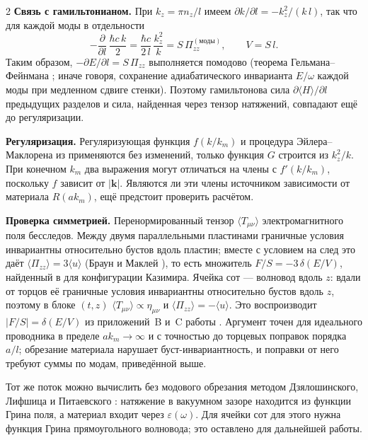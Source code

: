 \documentclass[twoside, 10pt]{article}
\def\myvspacebeforesubsection{-2.0mm}
\begin{document}
\begin{multicols}{2}
\textbf{Связь с гамильтонианом.} При $k_z=\pi n_z/l$ имеем
$\partial k/\partial l=-k_z^2/(k\,l)$, так что для каждой моды в отдельности
\[
-\frac{\partial}{\partial l}\,\frac{\hbar c\,k}{2}=\frac{\hbar c}{2\,l}\,\frac{k_z^2}{k}
= S\,\Pi_{zz}^{\mathrm{(моды)}},\qquad V=S\,l .
\]
Таким образом, $-\partial E/\partial l=S\,\Pi_{zz}$ выполняется помодово (теорема
Гельмана--Фейнмана \cite{Feynman1939}; иначе говоря, сохранение адиабатического
инварианта $E/\omega$ каждой моды при медленном сдвиге стенки). Поэтому
гамильтонова сила $\partial\langle H\rangle/\partial l$ предыдущих разделов и сила,
найденная через тензор натяжений, совпадают ещё до регуляризации.

\textbf{Регуляризация.} Регуляризующая функция $f(k/k_m)$ и процедура
Эйлера--Маклорена из \cite{Drozdov2024} применяются без изменений, только функция
$G$ строится из $k_z^2/k$. При конечном $k_m$ два выражения могут отличаться на
члены с $f'(k/k_m)$, поскольку $f$ зависит от $|\mathbf{k}|$. Являются ли эти члены
источником зависимости от материала $R(ak_m)$, ещё предстоит проверить расчётом.

\textbf{Проверка симметрией.} Перенормированный тензор $\langle T_{\mu\nu}\rangle$
электромагнитного поля бесследов. Между двумя параллельными пластинами граничные
условия инвариантны относительно бустов вдоль пластин; вместе с условием на след это
даёт $\langle\Pi_{zz}\rangle=3\langle u\rangle$ (Браун и Маклей \cite{BrownMaclay1969}),
то есть множитель $F/S=-3\,\delta(E/V)$, найденный в \cite{Drozdov2024} для
конфигурации Казимира. Ячейка сот --- волновод вдоль $z$: вдали от торцов её
граничные условия инвариантны относительно бустов вдоль $z$, поэтому в блоке $(t,z)$
$\langle T_{\mu\nu}\rangle\propto\eta_{\mu\nu}$ и $\langle\Pi_{zz}\rangle=-\langle u\rangle$.
Это воспроизводит $|F/S|=\delta(E/V)$ из приложений~B и~C работы \cite{Drozdov2024}.
Аргумент точен для идеального проводника в пределе $ak_m\to\infty$ и с точностью до
торцевых поправок порядка $a/l$; обрезание материала нарушает буст-инвариантность, и
поправки от него требуют суммы по модам, приведённой выше.

Тот же поток можно вычислить без модового обрезания методом Дзялошинского, Лифшица и
Питаевского \cite{DLP1961}: натяжение в вакуумном зазоре находится из функции Грина
поля, а материал входит через $\varepsilon(\omega)$. Для ячейки сот для этого нужна
функция Грина прямоугольного волновода; это оставлено для дальнейшей работы.

\vspace{\myvspacebeforesubsection}

\end{multicols}
\end{document}
